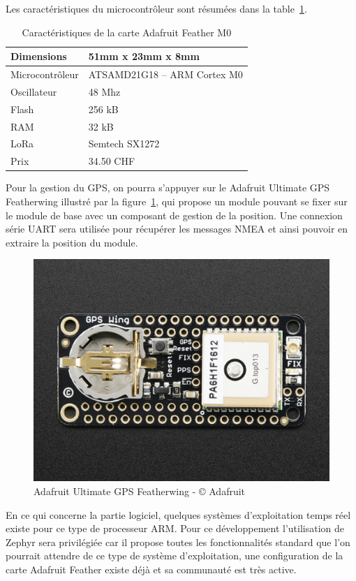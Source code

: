 Les caractéristiques du microcontrôleur sont résumées dans la table~\ref{tab:ada_feather_cara}.

\begin{table}[htb]
\caption[Caractéristiques de la carte Adafruit Feather M0]{Caractéristiques de la carte Adafruit Feather M0}
\label{tab:ada_feather_cara}
\centering
\begin{tabular}{ l | l }
\toprule
Dimensions & 51mm x 23mm x 8mm \\
\midrule
Microcontrôleur & ATSAMD21G18 – ARM Cortex M0 \\
\midrule
Oscillateur & 48 Mhz \\
\midrule
Flash & 256 kB \\
\midrule
RAM & 32 kB \\
\midrule
LoRa & Semtech SX1272 \\
\midrule
Prix & 34.50 CHF\\
\bottomrule 
\end{tabular}
\end{table}

Pour la gestion du GPS, on pourra s’appuyer sur le Adafruit Ultimate GPS Featherwing illustré par la figure~\ref{fig:ada_featherwing_gps}, qui propose un module pouvant se fixer sur le module de base avec un composant de gestion de la position. Une connexion série UART sera utilisée pour récupérer les messages NMEA et ainsi pouvoir en extraire la position du module.

\begin{figure}[htb]
\centering 
\includegraphics[width=0.4\columnwidth]{../images/adafruit-featherwing-ultimate-gps.jpg} 
\caption[Adafruit Ultimate GPS Featherwing]{Adafruit Ultimate GPS Featherwing - © Adafruit}
\label{fig:ada_featherwing_gps}
\end{figure}

En ce qui concerne la partie logiciel, quelques systèmes d’exploitation temps réel existe pour ce type de processeur ARM. Pour ce développement l’utilisation de Zephyr sera privilégiée car il propose toutes les fonctionnalités standard que l’on pourrait attendre de ce type de système d’exploitation, une configuration de la carte Adafruit Feather existe déjà et sa communauté est très active.

